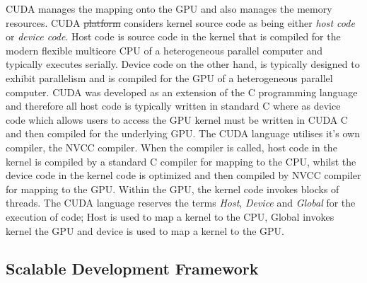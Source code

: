 \documentclass[10pt]{article}[draft]
\begin{document}
 CUDA manages the mapping onto the GPU and also manages the memory resources. CUDA \st{platform} considers kernel source code  as being either \emph{host code} or \emph{device code}. Host code is source code in the kernel that is compiled for the modern flexible multicore CPU of a heterogeneous parallel computer and typically executes serially. Device code on the other hand, is typically designed to exhibit parallelism and is compiled for the GPU of a heterogeneous parallel computer. CUDA was developed as an extension of the C programming language and therefore all host code is typically written in standard C where as device code which allows users to access the GPU kernel must be written in CUDA C and then compiled for the underlying GPU. The CUDA language utilises it's own compiler, the NVCC compiler.  When the compiler is called, host code in the kernel is compiled  by a standard C compiler for mapping to the CPU, whilst the device code in the kernel code is optimized and then compiled by NVCC compiler for mapping to the GPU. Within the GPU, the kernel code invokes blocks of threads.  The CUDA language reserves the terms \emph{Host}, \emph{Device} and \emph{Global} for the execution of code; Host is used to map a kernel to the CPU, Global invokes kernel the GPU and device is used to map a kernel to the GPU.

\subsection{Scalable Development Framework}
\end{document}
